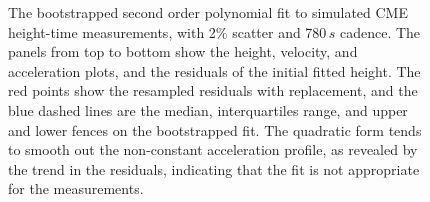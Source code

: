 \documentclass[structabstract]{aa}
\begin{document}
\begin{figure}[t]
\centering
{}
\caption{The bootstrapped second order polynomial fit to simulated CME height-time measurements, with 2\% scatter and 780$\,s$ cadence. The panels from top to bottom show the height, velocity, and acceleration plots, and the residuals of the initial fitted height. The red points show the resampled residuals with replacement, and the blue dashed lines are the median, interquartiles range, and upper and lower fences on the bootstrapped fit. The quadratic form tends to smooth out the non-constant acceleration profile, as revealed by the trend in the residuals, indicating that the fit is not appropriate for the measurements.}
\label{fig_quadratic}
\end{figure}
\end{document}

